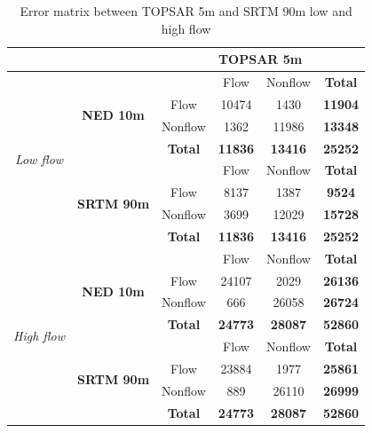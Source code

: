 \documentclass[12pt,letterpaper]{article}
\begin{document}
  \begin{table}[H]
    \caption{Error matrix between TOPSAR 5m and SRTM 90m low and high flow }
    \begin{tabular}{cccccc}
      \hline
      &&\multicolumn{4}{c}{\textbf{TOPSAR 5m}}\\
      \hline
      \multirow{8}{*}{\textit{Low flow}}&\multirow{4}{*}{\textbf{NED 10m}}&&Flow&Nonflow&\textbf{Total}\\
      &&Flow&10474&1430&\textbf{11904}\\
      &&Nonflow&1362&11986&\textbf{13348}\\
      &&\textbf{Total}&\textbf{11836}&\textbf{13416}&\textbf{25252}\\
      \cline{2-6}
      &\multirow{4}{*}{\textbf{SRTM 90m}}&&Flow&Nonflow&\textbf{Total}\\
      &&Flow&8137&1387&\textbf{9524}\\
      &&Nonflow&3699&12029&\textbf{15728}\\
      &&\textbf{Total}&\textbf{11836}&\textbf{13416}&\textbf{25252}\\
      \hline
      \hline
      \multirow{8}{*}{\textit{High flow}}&\multirow{4}{*}{\textbf{NED 10m}}&&Flow&Nonflow&\textbf{Total}\\
      &&Flow&24107&2029&\textbf{26136}\\
      &&Nonflow&666&26058&\textbf{26724}\\
      &&\textbf{Total}&\textbf{24773}&\textbf{28087}&\textbf{52860}\\
      \cline{2-6}
      &\multirow{4}{*}{\textbf{SRTM 90m}}&&Flow&Nonflow&\textbf{Total}\\
      &&Flow&23884&1977&\textbf{25861}\\
      &&Nonflow&889&26110&\textbf{26999}\\
      &&\textbf{Total}&\textbf{24773}&\textbf{28087}&\textbf{52860}\\
      \hline
    \end{tabular}
    \label{tab:Table4}
  \end{table}
\end{document}
